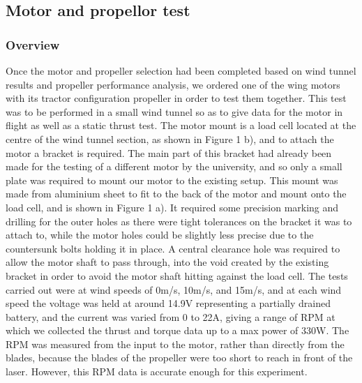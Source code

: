 \documentclass[../../main.tex]{subfiles}
\begin{document}
\subsection{Motor and propellor test} \label{sec:design-process:interim-design-review:motor-and-propellor-test}

\subsubsection{Overview} \label{sec:design-process:interim-design-review:motor-and-propellor-test:overview}


Once the motor and propeller selection had been completed based on wind tunnel results and propeller performance analysis, we ordered one of the wing motors with its tractor configuration propeller in order to test them together.
This test was to be performed in a small wind tunnel so as to give data for the motor in flight as well as a static thrust test.
The motor mount is a load cell located at the centre of the wind tunnel section, as shown in Figure 1 b), and to attach the motor a bracket is required.
The main part of this bracket had already been made for the testing of a different motor by the university, and so only a small plate was required to mount our motor to the existing setup.
This mount was made from aluminium sheet to fit to the back of the motor and mount onto the load cell, and is shown in Figure 1 a).
It required some precision marking and drilling for the outer holes as there were tight tolerances on the bracket it was to attach to, while the motor holes could be slightly less precise due to the countersunk bolts holding it in place.
A central clearance hole was required to allow the motor shaft to pass through, into the void created by the existing bracket in order to avoid the motor shaft hitting against the load cell.
The tests carried out were at wind speeds of 0m/s, 10m/s, and 15m/s, and at each wind speed the voltage was held at around 14.9V representing a partially drained battery, and the current was varied from 0 to 22A, giving a range of RPM at which we collected the thrust and torque data up to a max power of 330W.
The RPM was measured from the input to the motor, rather than directly from the blades, because the blades of the propeller were too short to reach in front of the laser.
However, this RPM data is accurate enough for this experiment.
\end{document}
